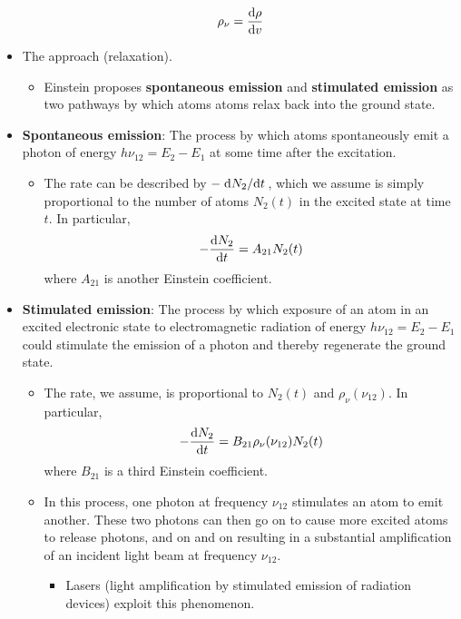 \documentclass[../notes.tex]{subfiles}
\begin{document}
\begin{itemize}
    \begin{equation*}
        \rho_\nu = \dv{\rho}{v}
    \end{equation*}
    \item The approach (relaxation).
    \begin{itemize}
        \item Einstein proposes \textbf{spontaneous emission} and \textbf{stimulated emission} as two pathways by which atoms atoms relax back into the ground state.
    \end{itemize}
    \item \textbf{Spontaneous emission}: The process by which atoms spontaneously emit a photon of energy $h\nu_{12}=E_2-E_1$ at some time after the excitation.
    \begin{itemize}
        \item The rate can be described by $-\dv*{N_2}{t}$, which we assume is simply proportional to the number of atoms $N_2(t)$ in the excited state at time $t$. In particular,
        \begin{equation*}
            -\dv{N_2}{t} = A_{21}N_2(t)
        \end{equation*}
        where $A_{21}$ is another Einstein coefficient.
    \end{itemize}
    \item \textbf{Stimulated emission}: The process by which exposure of an atom in an excited electronic state to electromagnetic radiation of energy $h\nu_{12}=E_2-E_1$ could stimulate the emission of a photon and thereby regenerate the ground state.
    \begin{itemize}
        \item The rate, we assume, is proportional to $N_2(t)$ and $\rho_\nu(\nu_{12})$. In particular,
        \begin{equation*}
            -\dv{N_2}{t} = B_{21}\rho_\nu(\nu_{12})N_2(t)
        \end{equation*}
        where $B_{21}$ is a third Einstein coefficient.
        \item In this process, one photon at frequency $\nu_{12}$ stimulates an atom to emit another. These two photons can then go on to cause more excited atoms to release photons, and on and on resulting in a substantial amplification of an incident light beam at frequency $\nu_{12}$.
        \begin{itemize}
            \item Lasers (light amplification by stimulated emission of radiation devices) exploit this phenomenon.

\end{itemize}
\end{itemize}
\end{itemize}
\end{document}
